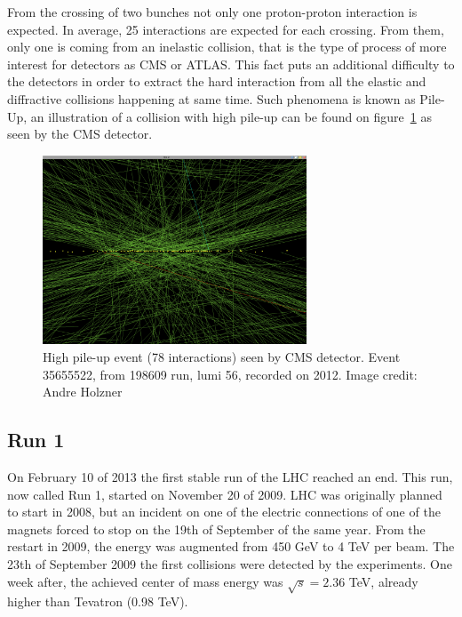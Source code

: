 From the crossing of two bunches not only one proton-proton interaction is expected. In average, 25 interactions are expected for each crossing. From them, only one is coming from an inelastic collision, that is the type of process of more interest for detectors as CMS or ATLAS. This fact puts an additional difficulty to the detectors in order to extract the hard interaction from all the elastic and diffractive collisions happening at same time. Such phenomena is known as Pile-Up, an illustration of a collision with high pile-up can be found on figure~\ref{fig:pileup} as seen by the CMS detector.

\begin{figure}[!Hhtbp]
  \begin{center}
    \includegraphics[width=0.7\textwidth]{figs/pileup.png}
    \caption{High pile-up event (78 interactions) seen by CMS detector. Event 35655522, from 198609 run, lumi 56, recorded on 2012. Image credit: Andre Holzner }
    \label{fig:pileup}
  \end{center}
\end{figure}

\subsection{Run 1}
\label{sec:run1}

On February 10 of 2013 the first stable run of the LHC reached an end. This run, now called Run 1, started on November 20 of 2009. LHC was originally planned to start in 2008, but an incident on one of the electric connections of one of the magnets forced to stop on the 19th of September of the same year. From the restart in 2009, the energy was augmented from 450 GeV to 4 TeV per beam. The 23th of September 2009 the first collisions were detected by the experiments. One week after, the achieved center of mass energy was $\sqrt{s}=2.36$ TeV, already higher than Tevatron (0.98 TeV).

